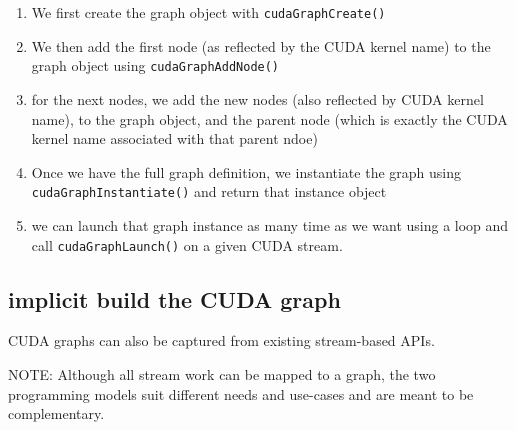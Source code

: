 \begin{enumerate}
  \item    We first create the graph object with \verb!cudaGraphCreate()!

  \item  We then add the first node (as reflected by the CUDA kernel name) to the graph object 
  using \verb!cudaGraphAddNode()!
  
  \item for the next nodes, we add the new nodes (also reflected by CUDA kernel name), to the graph object, and the 
  parent node (which is exactly the CUDA kernel name associated with that parent ndoe)
  
   \item Once we have the full graph definition, we instantiate the graph using
   \verb!cudaGraphInstantiate()! and return that instance object
   
   \item we can launch that graph instance as many time as we want using a loop and call 
   \verb!cudaGraphLaunch()! on a given CUDA stream.
\end{enumerate}



\subsection{implicit build the CUDA graph}

CUDA graphs can also be captured from existing stream-based APIs.

NOTE: Although all stream work can be mapped to a graph, the two programming
models suit different needs and use-cases and are meant to be complementary.

